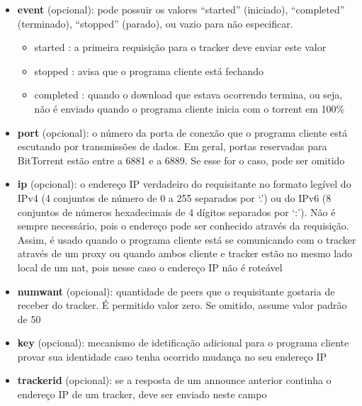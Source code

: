 \begin{itemize}
    \item \textbf{event} (opcional): pode possuir os valores ``started'' (iniciado),
    ``completed'' (terminado), ``stopped'' (parado), ou vazio para não especificar.
    \begin{itemize}
        \item started : a primeira requisição para o \gls*{tracker} deve enviar este
        valor
        \item stopped : avisa que o programa cliente está fechando
        \item completed : quando o download que estava ocorrendo termina, ou seja, não
        é enviado quando o programa cliente inicia com o \gls*{torrent} em 100\%
    \end{itemize}

    \item \textbf{port} (opcional): o número da porta de conexão que o programa cliente
    está escutando por transmissões de dados. Em geral, portas reservadas para
    BitTorrent estão entre a 6881 e a 6889. Se esse for o caso, pode ser omitido

    \item \textbf{ip} (opcional): o endereço IP verdadeiro do requisitante no formato
    legível do IPv4 (4 conjuntos de número de 0 a 255 separados por `.') ou do IPv6 (8
    conjuntos de números hexadecimais de 4 dígitos separados por `:'). Não é sempre
    necessário, pois o endereço pode ser conhecido através da requisição. Assim, é usado
    quando o programa cliente está se comunicando com o \gls*{tracker} através de um
    \gls{proxy} ou quando ambos cliente e \gls*{tracker} estão no mesmo lado local de um
    \gls{nat}, pois nesse caso o endereço IP não é roteável

    \item \textbf{numwant} (opcional): quantidade de \glspl*{peer} que o requisitante gostaria de receber do \gls*{tracker}. É permitido valor zero. Se omitido, assume valor padrão de 50

    \item \textbf{key} (opcional): mecanismo de idetificação adicional para o programa cliente provar sua identidade caso tenha ocorrido mudança no seu endereço IP

    \item \textbf{trackerid} (opcional): se a resposta de um \gls*{announce} anterior
    continha o endereço IP de um \gls*{tracker}, deve ser enviado neste campo
\end{itemize}

